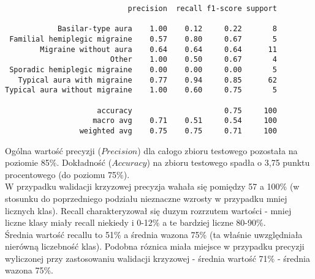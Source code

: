 \begin{verbatim}
                            precision  recall f1-score support

            Basilar-type aura    1.00    0.12     0.22       8
 Familial hemiplegic migraine    0.57    0.80     0.67       5
        Migraine without aura    0.64    0.64     0.64      11
                        Other    1.00    0.50     0.67       4
 Sporadic hemiplegic migraine    0.00    0.00     0.00       5
   Typical aura with migraine    0.77    0.94     0.85      62
Typical aura without migraine    1.00    0.60     0.75       5

                     accuracy                     0.75     100
                    macro avg    0.71    0.51     0.54     100
                 weighted avg    0.75    0.75     0.71     100
\end{verbatim}

Ogólna wartość precyzji ($Precision$) dla całogo zbioru testowego pozostała na poziomie 85\%. Dokładność ($Accuracy$) na zbioru testowego spadła o 3,75 punktu procentowego (do poziomu 75\%).\\

W przypadku walidacji krzyzowej precyzja wahała się pomiędzy 57 a 100\% (w stosunku do poprzedniego podziału nieznaczne wzrosty w przypadku mniej licznych klas). Recall charakteryzował się duzym rozrzutem wartości - mniej liczne klasy miały recall niekiedy i 0-12\% a te bardziej liczne 80-90\%.\\

Średnia wartość recallu to 51\% a średnia wazona 75\% (ta właśnie uwzględniała nierówną liczebność klas). Podobna róznica miała miejsce w przypadku precyzji wyliczonej przy zastosowaniu walidacji krzyzowej - średnia wartość 71\% - średnia wazona 75\%.